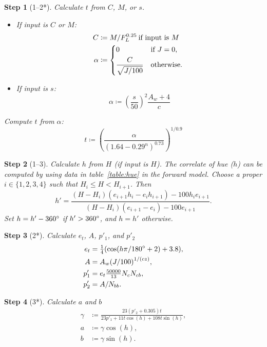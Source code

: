 \documentclass[twocolumn]{scrartcl}
\theoremstyle{named}
\newtheorem*{step}{Step}
\begin{document}
\begin{step}[1--2*]
Calculate $t$ from $C$, $M$, or $s$.
\begin{itemize}
  \item If input is $C$ or $M$:
    \begin{align*}
      C &\coloneqq M / F_L^{0.25} \:\text{if input is $M$}\\
      \alpha &\coloneqq \begin{dcases*}
          0 &if $J=0$,\\
          \frac{C}{\sqrt{J/100}}& otherwise.
      \end{dcases*}
    \end{align*}
  \item If input is $s$:
    \[
    \alpha \coloneqq {\left(\frac{s}{50}\right)}^2 \frac{A_w+4}{c}
    \]
\end{itemize}
Compute $t$ from $\alpha$:
\[
  t \coloneqq {\left(\frac{\alpha}{{(1.64 - 0.29^n)}^{0.73}}\right)}^{1/0.9}
\]
\end{step}

\begin{step}[1--3]
Calculate $h$ from $H$ (if input is $H$).
The correlate of hue ($h$) can be computed by using data in
table~\ref{table:hue} in the forward model.
Choose a proper $i\in\{1,2,3,4\}$ such that
$H_i \le H < H_{i+1}$. Then
\[
  h' = \frac{(H-H_i)(e_{i+1}h_i - e_i h_{i+1}) - 100 h_i e_{i+1}}{(H-H_i)(e_{i+1}-e_i) - 100 e_{i+1}}.
\]
Set $h = h' - 360\degree$ if $h' > 360\degree$, and $h=h'$ otherwise.
\end{step}

\begin{step}[2*]
Calculate $e_t$, $A$, $p'_1$, and $p'_2$
\begin{align*}
  e_t &= \tfrac{1}{4} (\cos(h\pi/180\degree + 2) + 3.8),\\
  A &= A_w  {(J/100)}^{1/(cz)},\\
  p'_1 &= e_t \tfrac{50000}{13} N_c N_{cb},\\
  p'_2 &= A / N_{bb}.
\end{align*}
\end{step}

\begin{step}[3*]
Calculate $a$ and $b$
  \begin{align*}
    \gamma &\coloneqq \frac{23 (p'_2+0.305) t}{23 p'_1 + 11 t \cos(h) + 108 t \sin(h)},\\
    a &\coloneqq \gamma \cos(h),\\
    b &\coloneqq \gamma \sin(h).
  \end{align*}
\end{step}
\end{document}
